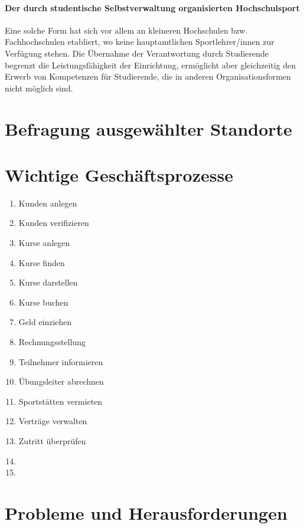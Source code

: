 \paragraph*{Der durch studentische Selbstverwaltung organisierten Hochschulsport}
Eine solche Form hat sich vor allem an kleineren Hochschulen bzw. Fachhochschulen etabliert, wo keine hauptamtlichen Sportlehrer/innen zur Verfügung stehen. Die Übernahme der Verantwortung durch Studierende begrenzt die Leistungsfähigkeit der Einrichtung, ermöglicht aber gleichzeitig den Erwerb von Kompetenzen für Studierende, die in anderen Organisationsformen nicht möglich sind. 



\section{Befragung ausgewählter Standorte}
\section{Wichtige Geschäftsprozesse}
\begin{enumerate}
\item Kunden anlegen
\item Kunden verifizieren
\item Kurse anlegen
\item Kurse finden
\item Kurse darstellen
\item Kurse buchen
\item Geld einziehen
\item Rechnungsstellung
\item Teilnehmer informieren
\item Übungsleiter abrechnen
\item Sportstätten vermieten
\item Verträge verwalten
\item Zutritt überprüfen
\item 
\item 
\end{enumerate}
\section{Probleme und Herausforderungen}